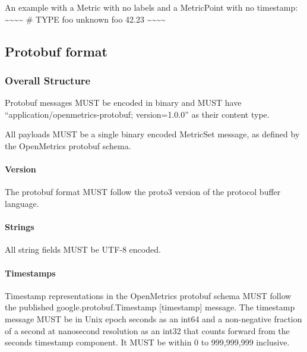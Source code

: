 \documentclass[a4paper,12pt,notitlepage,twoside,openright]{article}
\begin{document}
An example with a Metric with no labels and a MetricPoint with no
timestamp:
\textasciitilde\textasciitilde\textasciitilde\textasciitilde{} \# TYPE
foo unknown foo 42.23
\textasciitilde\textasciitilde\textasciitilde\textasciitilde{}

\hypertarget{protobuf-format}{%
\subsection{Protobuf format}\label{protobuf-format}}

\hypertarget{overall-structure-1}{%
\subsubsection{Overall Structure}\label{overall-structure-1}}

Protobuf messages MUST be encoded in binary and MUST have
``application/openmetrics-protobuf; version=1.0.0'' as their content
type.

All payloads MUST be a single binary encoded MetricSet message, as
defined by the OpenMetrics protobuf schema.

\hypertarget{version}{%
\paragraph{Version}\label{version}}

The protobuf format MUST follow the proto3 version of the protocol
buffer language.

\hypertarget{strings-1}{%
\paragraph{Strings}\label{strings-1}}

All string fields MUST be UTF-8 encoded.

\hypertarget{timestamps-2}{%
\paragraph{Timestamps}\label{timestamps-2}}

Timestamp representations in the OpenMetrics protobuf schema MUST follow
the published google.protobuf.Timestamp {[}timestamp{]} message. The
timestamp message MUST be in Unix epoch seconds as an int64 and a
non-negative fraction of a second at nanosecond resolution as an int32
that counts forward from the seconds timestamp component. It MUST be
within 0 to 999,999,999 inclusive.
\end{document}
